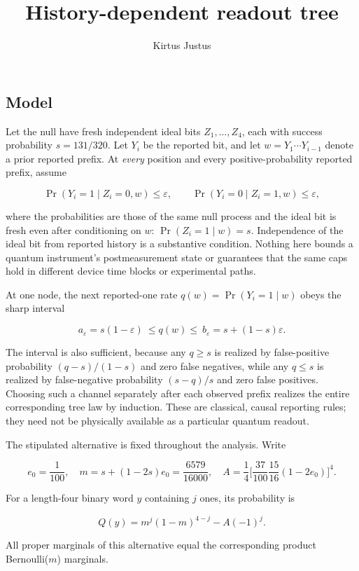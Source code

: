 \documentclass[
  10pt,
  a4paper,
]{article}
\title{History-dependent readout tree}
\author{Kirtus Justus}
\date{}
\begin{document}
\maketitle

\subsection{Model}\label{model}

Let the null have fresh independent ideal bits \(Z_1,\dots,Z_4\), each with success probability \(s=131/320\). Let \(Y_i\) be the reported bit, and let \(w=Y_1\cdots Y_{i-1}\) denote a prior reported prefix. At \emph{every} position and every positive-probability reported prefix, assume

\[
\Pr(Y_i=1\mid Z_i=0,w)\leq\varepsilon,\qquad
\Pr(Y_i=0\mid Z_i=1,w)\leq\varepsilon,
\]

where the probabilities are those of the same null process and the ideal bit is fresh even after conditioning on \(w\): \(\Pr(Z_i=1\mid w)=s\). Independence of the ideal bit from reported history is a substantive condition. Nothing here bounds a quantum instrument's postmeasurement state or guarantees that the same caps hold in different device time blocks or experimental paths.

At one node, the next reported-one rate \(q(w)=\Pr(Y_i=1\mid w)\) obeys the sharp interval

\[
 a_\varepsilon=s(1-\varepsilon)\ \leq q(w)\leq\ b_\varepsilon=s+(1-s)\varepsilon.\tag{1}
\]

The interval is also sufficient, because any \(q\geq s\) is realized by false-positive probability \((q-s)/(1-s)\) and zero false negatives, while any \(q\leq s\) is realized by false-negative probability \((s-q)/s\) and zero false positives. Choosing such a channel separately after each observed prefix realizes the entire corresponding tree law by induction. These are classical, causal reporting rules; they need not be physically available as a particular quantum readout.

The stipulated alternative is fixed throughout the analysis. Write

\[
 e_0=\frac1{100},\quad m=s+(1-2s)e_0=\frac{6579}{16000},\quad
 A=\frac14\biggl[\frac{37}{100}\frac{15}{16}(1-2e_0)\biggr]^4.
\]

For a length-four binary word \(y\) containing \(j\) ones, its probability is

\[
 Q(y)=m^j(1-m)^{4-j}-A(-1)^j.\tag{2}
\]

All proper marginals of this alternative equal the corresponding product Bernoulli(\(m\)) marginals.
\end{document}
